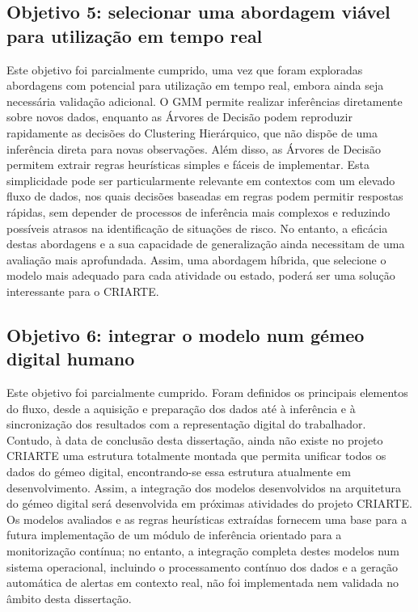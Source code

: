 \subsection*{Objetivo 5: selecionar uma abordagem viável para utilização em tempo real}

Este objetivo foi parcialmente cumprido, uma vez que foram exploradas abordagens com potencial para utilização em tempo real, embora ainda seja necessária validação adicional. O GMM permite realizar inferências diretamente sobre novos dados, enquanto as Árvores de Decisão podem reproduzir rapidamente as decisões do Clustering Hierárquico, que não dispõe de uma inferência direta para novas observações. Além disso, as Árvores de Decisão permitem extrair regras heurísticas simples e fáceis de implementar. Esta simplicidade pode ser particularmente relevante em contextos com um elevado fluxo de dados, nos quais decisões baseadas em regras podem permitir respostas rápidas, sem depender de processos de inferência mais complexos e reduzindo possíveis atrasos na identificação de situações de risco. No entanto, a eficácia destas abordagens e a sua capacidade de generalização ainda necessitam de uma avaliação mais aprofundada. Assim, uma abordagem híbrida, que selecione o modelo mais adequado para cada atividade ou estado, poderá ser uma solução interessante para o CRIARTE.

\subsection*{Objetivo 6: integrar o modelo num gémeo digital humano}

Este objetivo foi parcialmente cumprido. Foram definidos os principais elementos do fluxo, desde a aquisição e preparação dos dados até à inferência e à sincronização dos resultados com a representação digital do trabalhador. Contudo, à data de conclusão desta dissertação, ainda não existe no projeto CRIARTE uma estrutura totalmente montada que permita unificar todos os dados do gémeo digital, encontrando-se essa estrutura atualmente em desenvolvimento. Assim, a integração dos modelos desenvolvidos na arquitetura do gémeo digital será desenvolvida em próximas atividades do projeto CRIARTE. Os modelos avaliados e as regras heurísticas extraídas fornecem uma base para a futura implementação de um módulo de inferência orientado para a monitorização contínua; no entanto, a integração completa destes modelos num sistema operacional, incluindo o processamento contínuo dos dados e a geração automática de alertas em contexto real, não foi implementada nem validada no âmbito desta dissertação.

